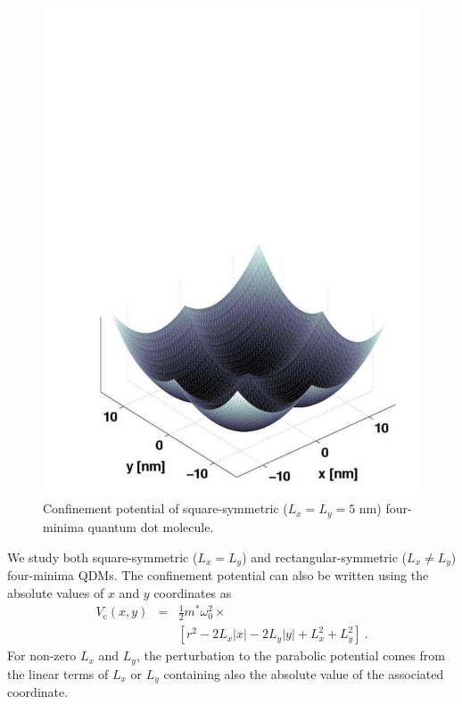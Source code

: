 \documentclass[twocolumn]{revtex4}
\begin{document}
\begin{figure}
\includegraphics*[width=1.0\columnwidth]{doublewell.pdf}
\caption{Confinement potential of square-symmetric ($L_x=L_y=5$ nm)
four-minima quantum dot molecule.}
\label{pot}
\end{figure}
%
 We study both square-symmetric ($L_x=L_y$) and rectangular-symmetric
($L_x \neq L_y$) four-minima QDMs. The confinement
potential can also be written using the absolute values of $x$ and $y$
coordinates as
\begin{eqnarray}
V_\mathrm{c}(x,y) &=& \frac 12 m^* \omega_0^2 \times \nonumber\\ &&
\left[ r^2 - 2 L_x |x| - 2 L_y |y| + L_x^2 + L_y^2 \right] \ .
\label{Vc_auki}
\end{eqnarray}
For non-zero $L_x$ and $L_y$, 
the perturbation to the parabolic potential comes from the linear
terms of $L_x$ or $L_y$ containing also the absolute value of the
associated coordinate.
\end{document}
